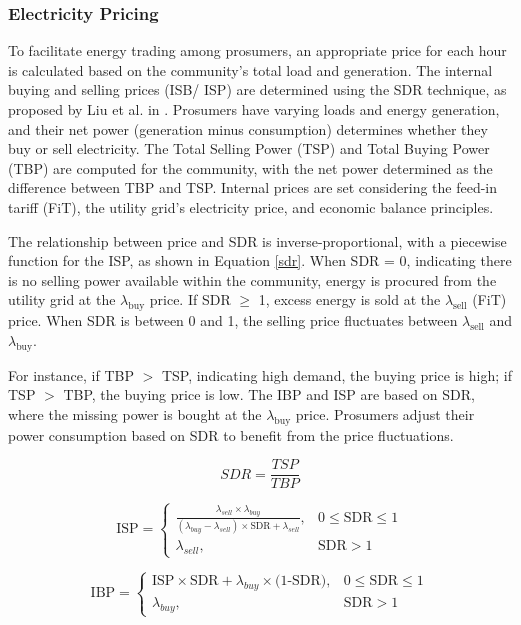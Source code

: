 \documentclass[preprint,12pt]{elsarticle}
\begin{document}
\subsubsection{Electricity Pricing}


To facilitate energy trading among prosumers, an appropriate price for each hour is calculated based on the community’s total load and generation. The internal buying and selling prices (ISB/ ISP) are determined using the SDR technique, as proposed by Liu et al. in \cite{liu2017energy}. Prosumers have varying loads and energy generation, and their net power (generation minus consumption) determines whether they buy or sell electricity. The Total Selling Power (TSP) and Total Buying Power (TBP) are computed for the community, with the net power determined as the difference between TBP and TSP. Internal prices are set considering the feed-in tariff (FiT), the utility grid’s electricity price, and economic balance principles.

The relationship between price and SDR is inverse-proportional, with a piecewise function for the ISP, as shown in Equation \ref{sdr}. When SDR = 0, indicating there is no selling power available within the community, energy is procured from the utility grid at the $\lambda_{\text{buy}}$ price. If SDR $\geq$ 1, excess energy is sold at the $\lambda_{\text{sell}}$ (FiT) price. When SDR is between 0 and 1, the selling price fluctuates between $\lambda_{\text{sell}}$ and $\lambda_{\text{buy}}$.

For instance, if TBP $>$ TSP, indicating high demand, the buying price is high; if TSP $>$ TBP, the buying price is low. The IBP and ISP are based on SDR, where the missing power is bought at the $\lambda_{\text{buy}}$ price. Prosumers adjust their power consumption based on SDR to benefit from the price fluctuations.

\begin{equation} \label{sdr} SDR = \frac{TSP}{TBP} \end{equation}

\begin{equation} \label{ISP} \text{ISP} = \begin{cases} \frac{\lambda_{sell} \times \lambda_{buy}}{(\lambda_{buy} - \lambda_{sell}) \times \text{SDR} + \lambda_{sell}}, & 0 \leq \text{SDR} \leq 1 \\ \lambda_{sell}, & \text{SDR} > 1 \end{cases} \end{equation}

\begin{equation} \label{IBP} \text{IBP} = \begin{cases} \text{ISP} \times \text{SDR} + \lambda_{buy} \times \text{(1-SDR)}, & 0 \leq \text{SDR} \leq 1 \\ \lambda_{buy}, & \text{SDR} > 1 \end{cases} \end{equation}
\end{document}
